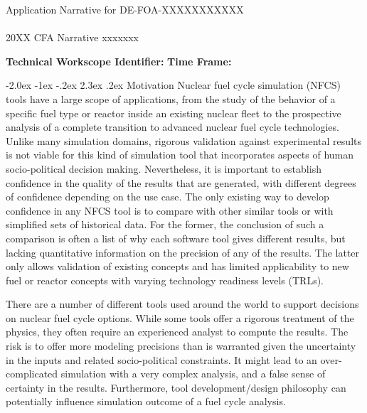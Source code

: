 \documentclass[dvips,11pt]{article}
\makeatletter
\renewcommand\section{\@startsection {section}{1}{\z@}%
                                   {-2.0ex \@plus -1ex \@minus -.2ex}%
                                   {2.3ex \@plus.2ex}%
                                   {\normalfont\bfseries}}%
\makeatother
\begin{document}
 
\begin{centering} Application Narrative for
    DE-FOA-XXXXXXXXXXX\\ \textbf{\large }\\ 20XX CFA Narrative xxxxxxx\\
\end{centering} 

\vspace{1em}

\noindent\textbf{Technical Workscope Identifier:}  \hspace{1.5in}
\textbf{Time Frame:}

\section{Motivation}
Nuclear fuel cycle simulation (NFCS) tools have a large scope of applications,
from the study of the behavior of a specific fuel type or reactor inside an
existing nuclear fleet to the prospective analysis of a complete transition to
advanced nuclear fuel cycle technologies. Unlike many simulation domains,
rigorous validation against experimental results is not viable for this kind of
simulation tool that incorporates aspects of human socio-political decision
making.  Nevertheless, it is important to establish confidence in the quality of
the results that are generated, with different degrees of confidence depending
on the use case.  The only existing way to develop confidence in any NFCS tool
is to compare with other similar tools or with simplified sets of historical
data. For the former, the conclusion of such a comparison is often a list of why
each software tool gives different results, but lacking quantitative information
on the precision of any of the results. The latter only allows validation of
existing concepts and has limited applicability to new fuel or reactor concepts
with varying technology readiness levels (TRLs).

There are a number of different tools used around the world to support decisions
on nuclear fuel cycle options.  While some tools offer a rigorous treatment of
the physics, they often require an experienced analyst to compute the results.
The risk is to offer more modeling precisions than is warranted given the
uncertainty in the inputs and related socio-political constraints. It might lead
to an over-complicated simulation with a very complex analysis, and a false
sense of certainty in the results. Furthermore, tool development/design
philosophy can potentially influence simulation outcome of a fuel cycle
analysis.
\end{document}
